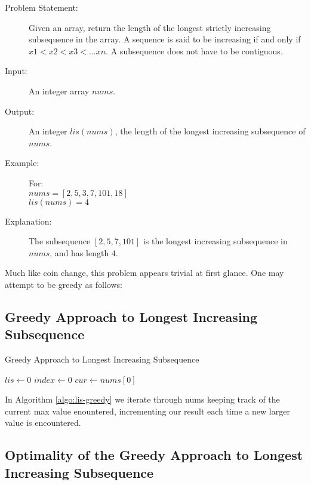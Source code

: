 
\begin{description}
    \item[Problem Statement:]
        Given an array, return the length of the longest strictly increasing subsequence in the array.
        A sequence is said to be increasing if and only if \\$x1<x2<x3<...xn$.
        A subsequence does not have to be contiguous.

    \item[Input:]
        An integer array $nums$.
        
    \item[Output:]
        An integer $lis(nums)$, the length of the longest increasing subsequence of $nums$.
    \item[Example:] For:\\
        $nums = [2,5,3,7,101,18]$\\
        $lis(nums) = 4$

    \item[Explanation:]
    The subsequence $[2,5,7,101]$ is the longest increasing subsequence in $nums$, and has length $4$.

        
\end{description}

Much like coin change, this problem appears trivial at first glance. One may attempt to be greedy as follows:

\subsection{Greedy Approach to Longest Increasing Subsequence}

\begin{algorithm}
    \caption{Greedy Approach to Longest Increasing Subsequence}
    \label{algo:lis-greedy}
    $lis \leftarrow 0$\;
    $index \leftarrow 0$\;
    $cur \leftarrow nums[0]$\;
\end{algorithm}
In Algorithm \ref{algo:lis-greedy} we iterate through nums keeping track of the current max value enountered, incrementing our result each time a new larger value is encountered.

\subsection{Optimality of the Greedy Approach to Longest Increasing Subsequence}

